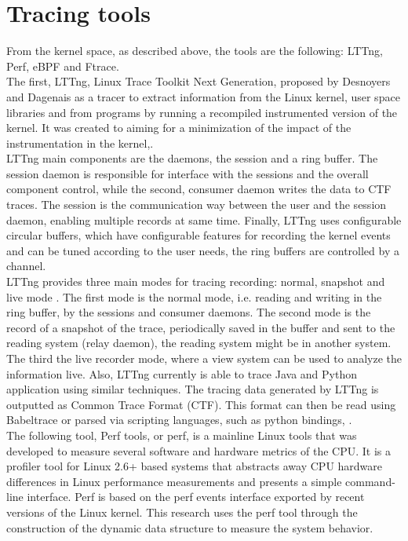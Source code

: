 \section{Tracing tools}
From the kernel space, as described above, the tools are the following: LTTng, Perf, eBPF and Ftrace.\\
The first, LTTng, Linux Trace Toolkit Next Generation, proposed by Desnoyers and Dagenais as a tracer to extract information from the Linux kernel, user space libraries and from programs by running a recompiled instrumented version of the kernel. It was created to aiming for a minimization of the impact of the instrumentation in the kernel,\cite{Montreal_thelttng}.\\
LTTng main components are the daemons, the session and a ring buffer. The session daemon is responsible for interface with the sessions and the overall component control, while the second, consumer daemon writes the data to CTF traces. The session is the communication way between the user and the session daemon, enabling multiple records at same time. Finally, LTTng uses configurable circular buffers, which have configurable features for recording the kernel events and can be tuned according to the user needs, the ring buffers are controlled by a channel.\\
LTTng provides three main modes for tracing recording: normal, snapshot and live mode \cite{lttng}. The first mode is the normal mode, i.e. reading and writing in the ring buffer, by  the sessions and consumer daemons. The second mode is the record of a snapshot of the trace, periodically saved in the buffer and sent to the reading system (relay daemon), the reading system might be in another system.  The third the live recorder mode, where a view system can be used to analyze the information live. Also, LTTng currently is able to trace Java and Python application using similar techniques. The tracing data generated by LTTng is outputted as Common Trace Format (CTF). This format can then be read using Babeltrace or parsed via scripting languages, such as python bindings, \cite{lttng}. \\
The following tool, Perf tools, or perf, is a mainline Linux tools that was developed to measure several software and hardware metrics of the CPU. It is a profiler tool for Linux 2.6+ based systems that abstracts away CPU hardware differences in Linux performance measurements and presents a simple command-line interface. Perf is based on the perf events interface exported by recent versions of the Linux kernel. This research uses the perf tool through the construction of the dynamic data structure to measure the system behavior. \\
